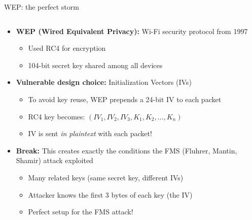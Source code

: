 \documentclass[aspectratio=169, lualatex, handout]{beamer}
\begin{document}
\begin{frame}{WEP: the perfect storm}
	\begin{columns}[c]
		\begin{column}{1\textwidth}
			\begin{itemize}
				\item \textbf{WEP (Wired Equivalent Privacy):} Wi-Fi security protocol from 1997
				      \begin{itemize}
					      \item Used RC4 for encryption
					      \item 104-bit secret key shared among all devices
				      \end{itemize}
				\item \textbf{Vulnerable design choice:} Initialization Vectors (IVs)
				      \begin{itemize}
					      \item To avoid key reuse, WEP prepends a 24-bit IV to each packet
					      \item RC4 key becomes: $(IV_1, IV_2, IV_3, K_1, K_2, \ldots, K_n)$
					      \item IV is sent \emph{in plaintext} with each packet!
				      \end{itemize}
				\item \textbf{Break:} This creates exactly the conditions the FMS (Fluhrer, Mantin, Shamir) attack exploited
				      \begin{itemize}
					      \item Many related keys (same secret key, different IVs)
					      \item Attacker knows the first 3 bytes of each key (the IV)
					      \item Perfect setup for the FMS attack!
				      \end{itemize}
			\end{itemize}
		\end{column}
	\end{columns}
\end{frame}
\end{document}

